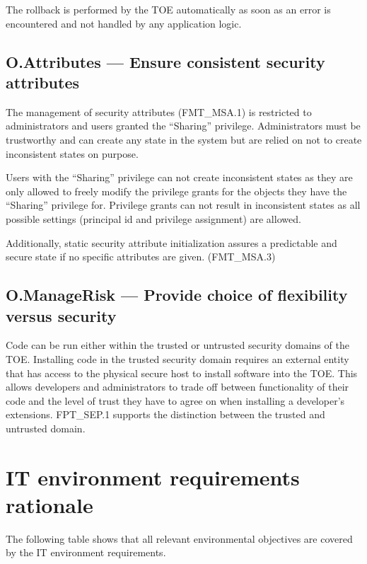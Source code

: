 \documentclass[12pt,english]{scrbook}
\begin{document}
    The rollback is performed by the TOE automatically as soon as an error is
    encountered and not handled by any application logic.

\subsection{O.Attributes --- Ensure consistent security attributes}

    The management of security attributes (FMT\_MSA.1) is restricted to
    administrators and users granted the ``Sharing'' privilege. Administrators
    must be trustworthy and can create any state in the system but are relied
    on not to create inconsistent states on purpose.

    Users with the ``Sharing'' privilege can not create inconsistent states as
    they are only allowed to freely modify the privilege grants for the objects
    they have the ``Sharing'' privilege for. Privilege grants can not result
    in inconsistent states as all possible settings (principal id and privilege
    assignment) are allowed.

    Additionally, static security attribute initialization assures
    a predictable and secure state if no specific attributes are given.
    (FMT\_MSA.3)

\subsection{O.ManageRisk --- Provide choice of flexibility versus security}
    
    Code can be run either within the trusted or untrusted security domains of
    the TOE. Installing code in the trusted security domain requires an
    external entity that has access to the physical secure host to install
    software into the TOE. This allows developers and administrators to trade
    off between functionality of their code and the level of trust they have to
    agree on when installing a developer's extensions. FPT\_SEP.1 supports the
    distinction between the trusted and untrusted domain.

\newpage

\section{IT environment requirements rationale}

The following table shows that all relevant environmental objectives are covered by the
IT environment requirements.
\end{document}
